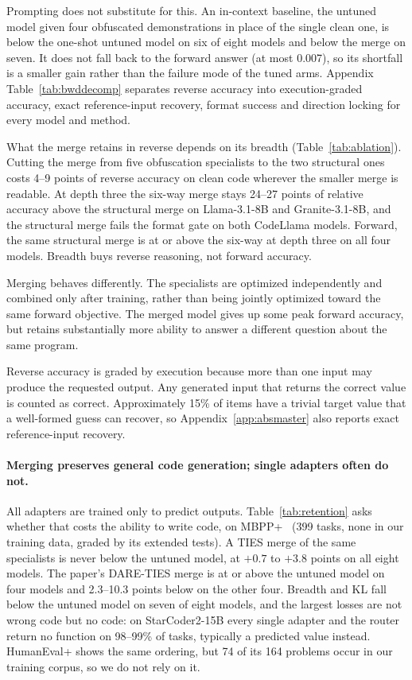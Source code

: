 

Prompting does not substitute for this. An in-context baseline, the untuned
model given four obfuscated demonstrations in place of the single clean one,
is below the one-shot untuned model on six of eight models and below the merge
on seven. It does not fall back to the forward answer (at most 0.007), so its
shortfall is a smaller gain rather than the failure mode of the tuned arms.
Appendix Table~\ref{tab:bwddecomp} separates reverse accuracy into
execution-graded accuracy, exact reference-input recovery, format success and
direction locking for every model and method.

What the merge retains in reverse depends on its breadth
(Table~\ref{tab:ablation}). Cutting the merge from five obfuscation
specialists to the two structural ones costs 4--9 points of reverse accuracy on
clean code wherever the smaller merge is readable. At depth three the six-way
merge stays 24--27 points of relative accuracy above the structural merge on
Llama-3.1-8B and Granite-3.1-8B, and the structural merge fails the format gate
on both CodeLlama models. Forward, the same structural merge is at or above the
six-way at depth three on all four models. Breadth buys reverse reasoning, not
forward accuracy.

Merging behaves differently. The specialists are optimized independently and
combined only after training, rather than being jointly optimized toward the
same forward objective. The merged model gives up some peak forward accuracy,
but retains substantially more ability to answer a different question about
the same program.

Reverse accuracy is graded by execution because more than one input may
produce the requested output. Any generated input that returns the correct
value is counted as correct. Approximately 15\% of items have a trivial target
value that a well-formed guess can recover, so
Appendix~\ref{app:absmaster} also reports exact reference-input recovery.

\paragraph{Merging preserves general code generation; single adapters often do not.}
All adapters are trained only to predict outputs. Table~\ref{tab:retention}
asks whether that costs the ability to write code, on MBPP+~\cite{liu2023evalplus}
(399 tasks, none in our training data, graded by its extended tests). A TIES
merge of the same specialists is never below the untuned model, at $+0.7$ to
$+3.8$ points on all eight models. The paper's DARE-TIES merge is at or above the
untuned model on four models and 2.3--10.3 points below on the other four.
Breadth and KL fall below the untuned model on seven of eight models, and the
largest losses are not wrong code but no code: on StarCoder2-15B every
single adapter and the router return no function on 98--99\% of tasks,
typically a predicted value instead. HumanEval+ shows the same ordering, but 74 of its 164 problems occur in
our training corpus, so we do not rely on it.

